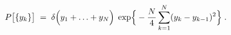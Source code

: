 \begin{equation}
P\bigl[ \{ y_k \} \bigr] \; = \; 
\delta \Bigl( y_1 + \ldots + y_N \Bigr) \; 
\exp \Bigr\{ - \frac{N}{4} \sum _{k=1}^N (y_{k} - y_{k-1})^2
\Bigr\} \; . 
\label{eq:a1} 
\end{equation} 
